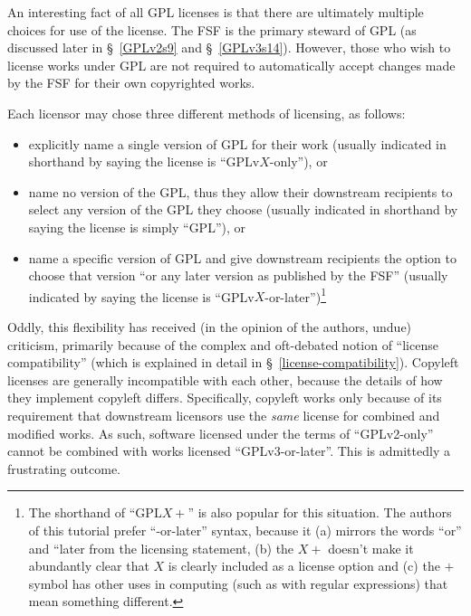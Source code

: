 An interesting fact of all GPL licenses is that there are ultimately multiple
choices for use of the license.  The FSF is the primary steward of GPL (as
discussed later in \S~\ref{GPLv2s9} and \S~\ref{GPLv3s14}).  However, those
who wish to license works under GPL are not required to automatically accept
changes made by the FSF for their own copyrighted works.

Each licensor may chose three different methods of licensing, as follows:

\begin{itemize}

\item explicitly name a single version of GPL for their work (usually
  indicated in shorthand by saying the license is ``GPLv$X$-only''), or

\item name no version of the GPL, thus they allow their downstream recipients
  to select any version of the GPL they choose (usually indicated in shorthand
  by saying the license is simply ``GPL''), or

\item name a specific version of GPL and give downstream recipients the
  option to choose that version ``or any later version as published by the
  FSF'' (usually indicated by saying the license is
  ``GPLv$X$-or-later'')\footnote{The shorthand of ``GPL$X+$'' is also popular
    for this situation.  The authors of this tutorial prefer ``-or-later''
    syntax, because it (a) mirrors the words ``or'' and ``later from the
    licensing statement, (b) the $X+$ doesn't make it abundantly clear that
    $X$ is clearly included as a license option and (c) the $+$ symbol has
    other uses in computing (such as with regular expressions) that mean
    something different.}
\end{itemize}

\label{license-compatibility-first-mentioned}

Oddly, this flexibility has received (in the opinion of the authors, undue)
criticism, primarily because of the complex and oft-debated notion of
``license compatibility'' (which is explained in detail in
\S~\ref{license-compatibility}).  Copyleft licenses are generally
incompatible with each other, because the details of how they implement
copyleft differs.  Specifically, copyleft works only because of its
requirement that downstream licensors use the \textit{same} license for
combined and modified works.  As such, software licensed under the terms of
``GPLv2-only'' cannot be combined with works licensed ``GPLv3-or-later''.
This is admittedly a frustrating outcome.

